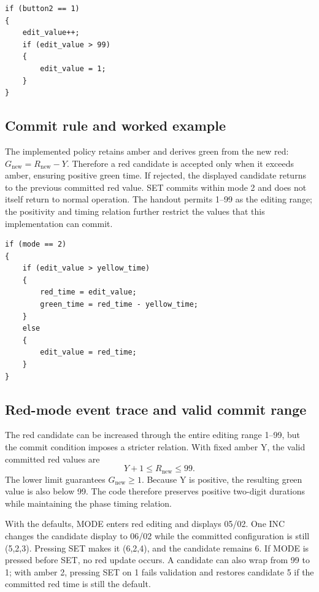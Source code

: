 \documentclass[a4paper]{article}
\newcommand{\topic}[1]{\subsection{#1}}
\begin{document}
\par\noindent\begin{minipage}{\linewidth}
\begin{lstlisting}[caption={Shared candidate increment in modes 2--4}]
if (button2 == 1)
{
    edit_value++;
    if (edit_value > 99)
    {
        edit_value = 1;
    }
}
\end{lstlisting}
\end{minipage}\par

\topic{Commit rule and worked example}
The implemented policy retains amber and derives green from the new red:
\(G_{\mathrm{new}}=R_{\mathrm{new}}-Y\).
Therefore a red candidate is accepted only when it exceeds amber, ensuring
positive green time. If rejected, the displayed candidate returns to the
previous committed red value. SET commits within mode 2 and does not itself
return to normal operation.
The handout permits 1--99 as the editing range; the positivity and timing
relation further restrict the values that this implementation can commit.

\par\noindent\begin{minipage}{\linewidth}
\begin{lstlisting}[caption={SET action for mode 2}]
if (mode == 2)
{
    if (edit_value > yellow_time)
    {
        red_time = edit_value;
        green_time = red_time - yellow_time;
    }
    else
    {
        edit_value = red_time;
    }
}
\end{lstlisting}
\end{minipage}\par

\topic{Red-mode event trace and valid commit range}

The red candidate can be increased through the entire editing range 1--99,
but the commit condition imposes a stricter relation. With fixed amber Y,
the valid committed red values are
\[
Y+1\le R_{\mathrm{new}}\le99.
\]
The lower limit guarantees \(G_{\mathrm{new}}\ge1\). Because Y is positive,
the resulting green value is also below 99. The code therefore preserves
positive two-digit durations while maintaining the phase timing relation.

With the defaults, MODE enters red editing and displays 05/02. One INC
changes the candidate display to 06/02 while the committed configuration is
still (5,2,3). Pressing SET makes it (6,2,4), and the candidate remains 6.
If MODE is pressed before SET, no red update occurs. A candidate can also
wrap from 99 to 1; with amber 2, pressing SET on 1 fails validation and
restores candidate 5 if the committed red time is still the default.
\end{document}
